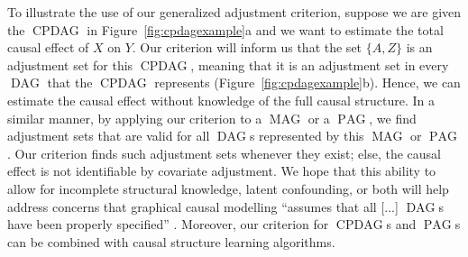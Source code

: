 \documentclass[11pt,a4paper]{article}
\DeclareMathOperator{\CPDAG}{CPDAG}
\DeclareMathOperator{\DAG}{DAG}
\DeclareMathOperator{\MAG}{MAG}
\DeclareMathOperator{\PAG}{PAG}
\begin{document}
To illustrate the use of our generalized adjustment
criterion, suppose we are given the $\CPDAG$
in Figure~\ref{fig:cpdagexample}a and we want to
estimate the total causal effect of $X$ on $Y$.
Our criterion will inform us that the set $\{A,Z\}$ is an
adjustment set for this $\CPDAG$, meaning that it
is an adjustment set in every $\DAG$ that the $\CPDAG$
represents (Figure~\ref{fig:cpdagexample}b). Hence, we can estimate the causal
effect without knowledge of the full causal structure.
In a similar manner, by applying our criterion to a $\MAG$
or a $\PAG$, we find adjustment sets that are
valid for all $\DAG$s represented by this $\MAG$ or $\PAG$.
Our criterion finds such
adjustment sets whenever they exist;
 else, the causal effect is not identifiable by covariate adjustment. 
We hope that this ability to allow for incomplete
structural knowledge, latent confounding, or
both will help address concerns
that graphical causal modelling ``assumes that all [...] $\DAG$s
have been properly specified'' \citep{West2014}. Moreover, our criterion for
$\CPDAG$s and $\PAG$s can be combined with causal structure learning algorithms.
\end{document}
